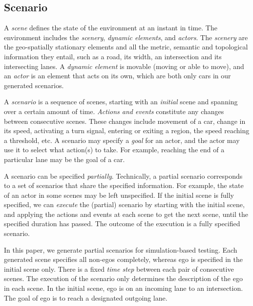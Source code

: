 \subsection{Scenario}
A \emph{scene} defines the state of the environment at an instant in time.
%
The environment includes the \emph{scenery}, \emph{dynamic elements}, and \emph{actors}.
%
The \emph{scenery} are the geo-spatially stationary elements and all the metric, semantic and topological information they entail, such as a road, its width, an intersection and its intersecting lanes.
%
A \emph{dynamic element} is movable (moving or able to move), and an \emph{actor} is an element that acts on its own, which are both only cars in our generated scenarios.

A \emph{scenario} is a sequence of scenes, starting with an \emph{initial} scene and  spanning over a certain amount of time.
%
\emph{Actions and events} constitute any changes between consecutive scenes.
%
These changes include movement of a car, change in its speed, activating a turn signal, entering or exiting a region, the speed reaching a threshold, etc.
%
A scenario may specify a \emph{goal} for an actor, and the actor may use it to select what action(s) to take.
%
For example, reaching the end of a particular lane may be the goal of a car.


A scenario can be specified \emph{partially}.
%
Technically, a partial scenario corresponds to a set of scenarios that share the specified information.
%
For example, the state of an actor in some scenes may be left unspecified.
%
If the initial scene is fully specified, we can \emph{execute} the (partial) scenario by starting with the initial scene, and applying the actions and events at each scene to get the next scene, until the specified duration has passed.
%
The outcome of the execution is a fully specified scenario.


In this paper, we generate partial scenarios for simulation-based testing.
%
Each generated scene specifies all non-egos completely, whereas ego is specified in the initial scene only.
%
There is a fixed \emph{time step} between each pair of consecutive scenes.
%
The execution of the scenario only determines the description of the ego in each scene.
%
In the initial scene, ego is on an incoming lane to an intersection.
%
The goal of ego is to reach a designated outgoing lane.
